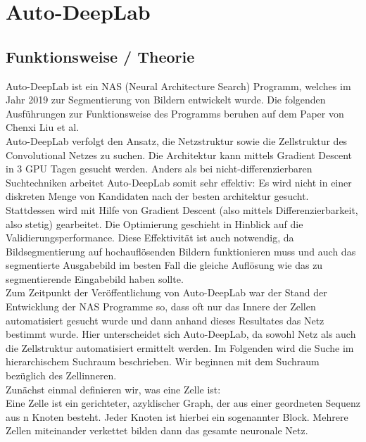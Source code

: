 \chapter{Auto-DeepLab}
\label{ch:autodeeplab}


\section{Funktionsweise / Theorie}

Auto-DeepLab ist ein NAS (Neural Architecture Search) Programm, welches im Jahr 2019 zur Segmentierung von Bildern entwickelt wurde. Die folgenden Ausführungen zur Funktionsweise des Programms beruhen auf dem Paper \cite{autodeeplabPaper} von Chenxi Liu et al.\\
Auto-DeepLab verfolgt den Ansatz, die Netzstruktur sowie die Zellstruktur des Convolutional Netzes zu suchen. Die Architektur kann mittels Gradient Descent in 3 GPU Tagen gesucht werden. Anders als bei nicht-differenzierbaren Suchtechniken arbeitet Auto-DeepLab somit sehr effektiv: Es wird nicht in einer diskreten Menge von Kandidaten nach der besten architektur gesucht. Stattdessen wird mit Hilfe von Gradient Descent (also mittels Differenzierbarkeit, also stetig) gearbeitet. Die Optimierung geschieht in Hinblick auf die Validierungsperformance. Diese Effektivität ist auch notwendig, da Bildsegmentierung auf hochauflösenden Bildern funktionieren muss und auch das segmentierte Ausgabebild im besten Fall die gleiche Auflösung wie das zu segmentierende Eingabebild haben sollte.\\
Zum Zeitpunkt der Veröffentlichung von Auto-DeepLab war der Stand der Entwicklung der NAS Programme so, dass oft nur das Innere der Zellen automatisiert gesucht wurde und dann anhand dieses Resultates das Netz bestimmt wurde. Hier unterscheidet sich Auto-DeepLab, da sowohl Netz als auch die Zellstruktur automatisiert ermittelt werden.
Im Folgenden wird die Suche im hierarchischem Suchraum beschrieben. Wir beginnen mit dem Suchraum bezüglich des Zellinneren.\\[0.3cm]
Zunächst einmal definieren wir, was eine Zelle ist:\\
Eine Zelle ist ein gerichteter, azyklischer Graph, der aus einer geordneten Sequenz aus n Knoten besteht. Jeder Knoten ist hierbei ein sogenannter Block. Mehrere Zellen miteinander verkettet bilden dann das gesamte neuronale Netz.\\
